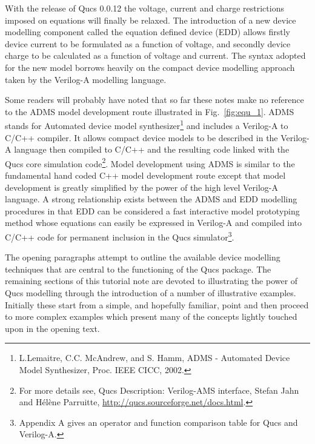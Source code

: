 \vspace{5mm}

With the release of Qucs 0.0.12 the voltage, current and charge
restrictions imposed on equations will finally be relaxed. The
introduction of a new device modelling component called the equation
defined device (EDD) allows firstly device current to be formulated as
a function of voltage, and secondly device charge to be calculated as
a function of voltage and current.  The syntax adopted for the new
model borrows heavily on the compact device modelling approach taken
by the Verilog-A modelling language.

\vspace{5mm}

Some readers will probably have noted that so far these notes make no
reference to the ADMS model development route illustrated in
Fig.~\ref{fig:equ_1}. ADMS stands for Automated device model
synthesizer\footnote{L.Lemaitre, C.C. McAndrew, and S. Hamm, ADMS -
Automated Device Model Synthesizer, Proc. IEEE CICC, 2002.} and
includes a Verilog-A to C/C++ compiler. It allows compact device
models to be described in the Verilog-A language then compiled to
C/C++ and the resulting code linked with the Qucs core simulation
code\footnote{For more details see, Qucs Description: Verilog-AMS
interface, Stefan Jahn and H\'{e}l\`{e}ne Parruitte,
\url{http://qucs.sourceforge.net/docs.html}.}. Model development using
ADMS is similar to the fundamental hand coded C++ model development
route except that model development is greatly simplified by the power
of the high level Verilog-A language.  A strong relationship exists
between the ADMS and EDD modelling procedures in that EDD can be
considered a fast interactive model prototyping method whose equations
can easily be expressed in Verilog-A and compiled into C/C++ code for
permanent inclusion in the Qucs simulator\footnote{Appendix A gives an
operator and function comparison table for Qucs and Verilog-A.}.

\vspace{5mm}

The opening paragraphs attempt to outline the available device
modelling techniques that are central to the functioning of the Qucs
package. The remaining sections of this tutorial note are devoted to
illustrating the power of Qucs modelling through the introduction of a
number of illustrative examples.  Initially these start from a simple,
and hopefully familiar, point and then proceed to more complex
examples which present many of the concepts lightly touched upon in
the opening text.


